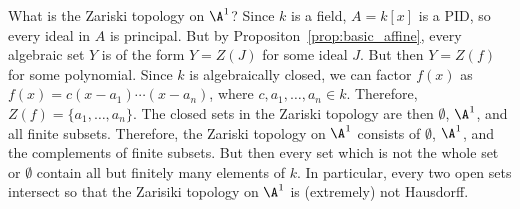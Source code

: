 \begin{ex}
What is the Zariski topology on $\A^1$? Since $k$ is a field, $A= k[x]$ is a PID, so every ideal in $A$ is principal. But by Propositon~\ref{prop:basic_affine}, every algebraic set $Y$ is of the form $Y= Z(J)$ for some ideal $J$. But then $Y=Z(f)$ for some polynomial. Since $k$ is algebraically closed, we can factor $f(x)$ as $f(x)= c(x-a_1)\cdots(x-a_n)$, where $c, a_1,\ldots,a_n \in k$. Therefore, $Z(f)= \{a_1,\ldots,a_n\}$. The closed sets in the Zariski topology are then $\emptyset$, $\A^1$, and all finite subsets. Therefore, the Zariski topology on $\A^1$ consists of $\emptyset$, $\A^1$, and the complements of finite subsets. But then every set which is not the whole set or $\emptyset$ contain all but finitely many elements of $k$. In particular, every two open sets intersect so that the Zarisiki topology on $\A^1$ is (extremely) not Hausdorff. \xqed
\end{ex}



































